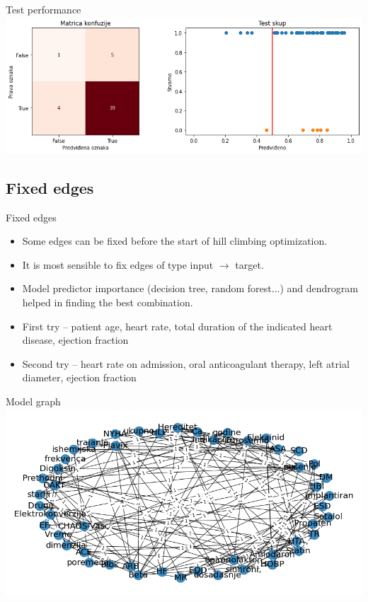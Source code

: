 \documentclass[hyperref={bookmarks=false}]{beamer}
\begin{document}
\begin{frame}{Test performance}
\includegraphics[width=\textwidth]{learn2.png}
\end{frame}

\subsection{Fixed edges}
\begin{frame}{Fixed edges}
\begin{itemize}
    \item Some edges can be fixed before the start of hill climbing optimization.
    \item It is most sensible to fix edges of type input $\rightarrow$ target.
    \item Model predictor importance (decision tree, random forest...) and dendrogram helped in finding the best combination.
    \item First try -- patient age, heart rate, total duration of the indicated heart disease, ejection fraction
    \item Second try -- heart rate on admission, oral anticoagulant therapy, left atrial diameter, ejection fraction
\end{itemize}
\end{frame}

\begin{frame}{Model graph}
\includegraphics[width=\textwidth]{fixed1.png}
\end{frame}
\end{document}
